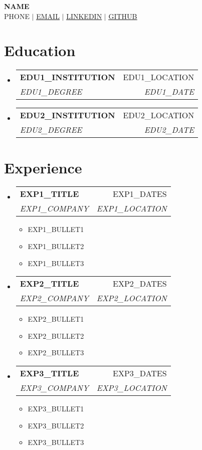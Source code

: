 \documentclass[letterpaper,11pt]{article}
\makeatletter
\newcommand{\resumeItem}[1]{
  \item\small{
    {#1 \vspace{-2pt}}
  }
}
\newcommand{\resumeSubheading}[4]{
  \vspace{-2pt}\item
    \begin{tabular*}{0.97\textwidth}[t]{l@{\extracolsep{\fill}}r}
      \textbf{#1} & #2 \\
      \textit{\small#3} & \textit{\small #4} \\
    \end{tabular*}\vspace{-7pt}
}
\newcommand{\resumeSubHeadingListStart}{\begin{itemize}[leftmargin=0.15in, label={}]}
\newcommand{\resumeSubHeadingListEnd}{\end{itemize}}
\newcommand{\resumeItemListStart}{\begin{itemize}}
\newcommand{\resumeItemListEnd}{\end{itemize}\vspace{-5pt}}
\makeatother
\begin{document}
\begin{center}
    \textbf{\Huge \scshape {{NAME}}} \\ \vspace{1pt}
    \small {{PHONE}} $|$ 
    \href{mailto:x@x.com{{EMAIL}}}{\underline{{{EMAIL}}}} $|$
    \href{https://linkedin.com/in/...}{\underline{{{LINKEDIN}}}} $|$
    \href{https://github.com/...}{\underline{{{GITHUB}}}}
\end{center}


\section{Education}
  \resumeSubHeadingListStart

    \resumeSubheading
      { {{EDU1_INSTITUTION}} }{ {{EDU1_LOCATION}} }
      { {{EDU1_DEGREE}} }{ {{EDU1_DATE}} }

    \resumeSubheading
      { {{EDU2_INSTITUTION}} }{ {{EDU2_LOCATION}} }
      { {{EDU2_DEGREE}} }{ {{EDU2_DATE}} }

  \resumeSubHeadingListEnd


\section{Experience}
  \resumeSubHeadingListStart

    \resumeSubheading
      { {{EXP1_TITLE}} }{ {{EXP1_DATES}} }
      { {{EXP1_COMPANY}} }{ {{EXP1_LOCATION}} }
      \resumeItemListStart
        \resumeItem{ {{EXP1_BULLET1}} }
        \resumeItem{ {{EXP1_BULLET2}} }
        \resumeItem{ {{EXP1_BULLET3}} }
      \resumeItemListEnd

    \resumeSubheading
      { {{EXP2_TITLE}} }{ {{EXP2_DATES}} }
      { {{EXP2_COMPANY}} }{ {{EXP2_LOCATION}} }
      \resumeItemListStart
        \resumeItem{ {{EXP2_BULLET1}} }
        \resumeItem{ {{EXP2_BULLET2}} }
        \resumeItem{ {{EXP2_BULLET3}} }
      \resumeItemListEnd

    \resumeSubheading
      { {{EXP3_TITLE}} }{ {{EXP3_DATES}} }
      { {{EXP3_COMPANY}} }{ {{EXP3_LOCATION}} }
      \resumeItemListStart
        \resumeItem{ {{EXP3_BULLET1}} }
        \resumeItem{ {{EXP3_BULLET2}} }
        \resumeItem{ {{EXP3_BULLET3}} }
      \resumeItemListEnd

  \resumeSubHeadingListEnd
\end{document}
